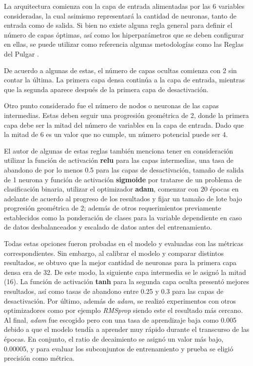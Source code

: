 La arquitectura comienza con la capa de entrada alimentadas por las 6 variables consideradas, la cual asimismo representará la cantidad de neuronas, tanto de entrada como de salida.
Si bien no existe alguna regla general para definir el número de capas óptimas, así como los hiperparámetros que se deben configurar en ellas, se puede utilizar como referencia algunas metodologías como las Reglas del Pulgar \parencite{tec_ranjan2019thumbrules}.

De acuerdo a algunas de estas, el número de capas ocultas comienza con 2 sin contar la última. La primera capa densa continúa a la capa de entrada, mientras que la segunda aparece después de la primera capa de desactivación.

Otro punto considerado fue el número de nodos o neuronas de las capas intermedias. Estas deben seguir una progresión geométrica de 2, donde la primera capa debe ser la mitad del número de variables en la capa de entrada. Dado que la mitad de 6 es un valor que no cumple, un número potencial puede ser 4.

El autor de algunas de estas reglas también menciona tener en consideración utilizar la función de activación \textbf{relu} para las capas intermedias, una tasa de abandono de por lo menos 0.5 para las capas de desactivación, tamaño de salida de 1 neurona y función de activación \textbf{sigmoide} por tratarse de un problema de clasificación binaria, utilizar el optimizador \textbf{adam}, comenzar con 20 épocas en adelante de acuerdo al progreso de los resultados y fijar un tamaño de lote bajo progresión geométrica de 2; además de otros requerimientos previamente establecidos como la ponderación de clases para la variable dependiente en caso de datos desbalanceados y escalado de datos antes del entrenamiento.

Todas estas opciones fueron probadas en el modelo y evaluadas con las métricas correspondientes. Sin embargo, al calibrar el modelo y comparar distintos resultados, se obtuvo que la mejor cantidad de neuronas para la primera capa densa era de 32. De este modo, la siguiente capa intermedia se le asignó la mitad (16). La función de activación \textbf{tanh} para la segunda capa oculta presentó mejores resultados, así como tasas de abandono entre 0.25 y 0.3 para las capas de desactivación. Por último, además de \textit{adam}, se realizó experimentos con otros optimizadores como por ejemplo \textit{RMSprop} siendo este el resultado más cercano. Al final, \textit{adam} fue escogido pero con una tasa de aprendizaje baja como 0.005 debido a que el modelo tendía a aprender muy rápido durante el transcurso de las épocas. En conjunto, el ratio de decaimiento se asignó un valor más bajo, 0.00005, y para evaluar los subconjuntos de entrenamiento y prueba se eligió precisión como métrica.

